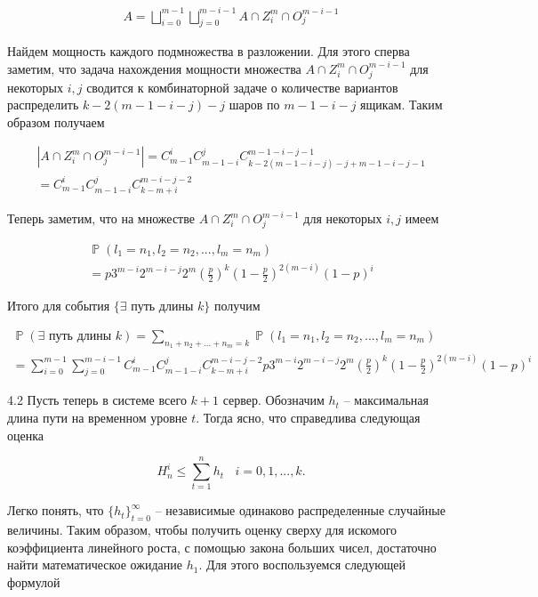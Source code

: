 \documentclass[10pt, reqno]{amsart}
\DeclareMathOperator*{\Pb}{\mathbb{P}}
\begin{document}
  \begin{align*}
    A = \bigsqcup_{i=0}^{m-1}\bigsqcup_{j=0}^{m-i-1}A \cap Z_{i}^{m} \cap O_{j}^{m-i-1}
  \end{align*}
  
  Найдем мощность каждого подмножества в разложении. Для этого сперва заметим, что задача нахождения мощности множества $A \cap Z_{i}^{m} \cap O_{j}^{m-i-1}$ для некоторых $i, j$ сводится к комбинаторной задаче о количестве вариантов распределить $k-2(m-1-i-j)-j$ шаров по $m-1-i-j$ ящикам. Таким образом получаем
  
  \begin{align*}
    |A \cap Z_{i}^{m} \cap O_{j}^{m-i-1}| = C_{m-1}^{i}C_{m-1-i}^{j}C_{k-2(m-1-i-j)-j+m-1-i-j-1}^{m-1-i-j-1} \\ = C_{m-1}^{i}C_{m-1-i}^{j}C_{k-m+i}^{m-i-j-2}
  \end{align*}
  
  Теперь заметим, что на множестве $A \cap Z_{i}^{m} \cap O_{j}^{m-i-1}$ для некоторых $i, j$ имеем
  
  \begin{align*}
    \Pb(l_{1}=n_{1}, l_{2}=n_{2},..., l_{m}=n_{m}) \\ = p3^{m-i}2^{m-i-j}2^{m}(\frac{p}{2})^{k}(1-\frac{p}{2})^{2(m-i)}(1-p)^{i}
  \end{align*}
  
  Итого для события $\{\exists \text{ путь длины } k\}$ получим
  
  \begin{align*}
    \Pb(\exists \text{ путь длины } k) = \sum_{n_{1}+n_{2}+...+n_{m} = k}\Pb(l_{1}=n_{1}, l_{2}=n_{2},..., l_{m}=n_{m}) \\ = \sum_{i=0}^{m-1}\sum_{j=0}^{m-i-1}C_{m-1}^{i}C_{m-1-i}^{j}C_{k-m+i}^{m-i-j-2}p3^{m-i}2^{m-i-j}2^{m}(\frac{p}{2})^{k}(1-\frac{p}{2})^{2(m-i)}(1-p)^{i}
  \end{align*}
  
  4.2 Пусть теперь в системе всего $k+1$ сервер. Обозначим $h_{t}$ -- максимальная длина пути на временном уровне $t$. Тогда ясно, что справедлива следующая оценка
  
  \begin{equation}
      H_{n}^{i} \leq \sum_{t=1}^{n}h_{t} \:\:\:\: i=0,1,...,k.
  \end{equation}
  
  Легко понять, что $\{h_{t}\}_{t=0}^{\infty}$ -- независимые одинаково распределенные случайные величины. Таким образом, чтобы получить оценку сверху для искомого коэффициента линейного роста, с помощью закона больших чисел, достаточно найти математическое ожидание $h_{1}$. Для этого воспользуемся следующей формулой
  
\end{document}
